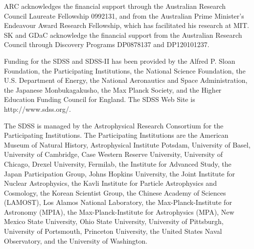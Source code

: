 \documentclass{emulateapj}
\begin{document}
\acknowledgements
ARC acknowledges the financial support through the Australian Research Council Laureate Fellowship 0992131, and from the Australian Prime Minister's Endeavour Award Research Fellowship, which has facilitated his research at MIT. SK and GDaC acknowledge the financial support from the Australian Research Council through Discovery Programs DP0878137 and DP120101237.

Funding for the SDSS and SDSS-II has been provided by the Alfred P. Sloan Foundation, the Participating Institutions, the National Science Foundation, the U.S. Department of Energy, the National Aeronautics and Space Administration, the Japanese Monbukagakusho, the Max Planck Society, and the Higher Education Funding Council for England. The SDSS Web Site is http://www.sdss.org/.

The SDSS is managed by the Astrophysical Research Consortium for the Participating Institutions. The Participating Institutions are the American Museum of Natural History, Astrophysical Institute Potsdam, University of Basel, University of Cambridge, Case Western Reserve University, University of Chicago, Drexel University, Fermilab, the Institute for Advanced Study, the Japan Participation Group, Johns Hopkins University, the Joint Institute for Nuclear Astrophysics, the Kavli Institute for Particle Astrophysics and Cosmology, the Korean Scientist Group, the Chinese Academy of Sciences (LAMOST), Los Alamos National Laboratory, the Max-Planck-Institute for Astronomy (MPIA), the Max-Planck-Institute for Astrophysics (MPA), New Mexico State University, Ohio State University, University of Pittsburgh, University of Portsmouth, Princeton University, the United States Naval Observatory, and the University of Washington.



\end{document}
